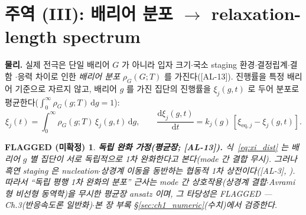 \documentclass[11pt,a4paper]{article}
\newtheorem*{flagbox}{FLAGGED (미확정)}
\newcommand{\dd}{\mathrm{d}}
\newcommand{\eq}{\mathrm{eq}}
\newcommand{\AL}[1]{\textsf{[AL-#1]}}
\begin{document}
\section{주역 (III): 배리어 분포 $\to$ relaxation-length spectrum}\label{sec:spectrum}
\textbf{물리.} 실제 전극은 단일 배리어 $G$ 가 아니라 입자 크기$\cdot$국소 staging 환경$\cdot$결정립계$\cdot$결함
$\cdot$응력 차이로 인한 \emph{배리어 분포} $\rho_G(G;T)$ 를 가진다(\AL{13}). 진행률을 특정 배리어 기준으로
자르지 않고, 배리어 $g$ 를 가진 집단의 진행률을 $\xi_j(g,t)$ 로 두어 분포로 평균한다($\int_0^\infty
\rho_G(g;T)\,\dd g=1$):
\begin{equation}
\xi_j(t)=\int_0^\infty \rho_G(g;T)\,\xi_j(g,t)\,\dd g,\qquad
\frac{\dd\xi_j(g,t)}{\dd t}=k_j(g)\,[\xi_{\eq,j}-\xi_j(g,t)].
\label{eq:xi_dist}
\end{equation}
\begin{flagbox}
\textbf{독립 완화 가정(평균장; \AL{13}).} 식~\eqref{eq:xi_dist} 는 배리어 $g$ 별 집단이 \emph{서로 독립적으로}
1차 완화한다고 본다(mode 간 결합 무시). 그러나 흑연 staging 은 nucleation$\cdot$상경계 이동을 동반하는
\emph{협동적 1차 상전이}다(\AL{3}, \cite{funabiki1999ea,funabiki1999jes}). 따라서 ``독립 평행 1차 완화의 분포''
근사는 mode 간 상호작용(상경계 결합$\cdot$Avrami 형 비선형 동역학)을 무시한 \emph{평균장 ansatz} 이며, 그 타당성은
FLAGGED — Ch.3(반응속도론 일반화)$\cdot$본 장 부록 \S\ref{sec:ch1_numeric}(수치)에서 검증한다.
\end{flagbox}
\end{document}
